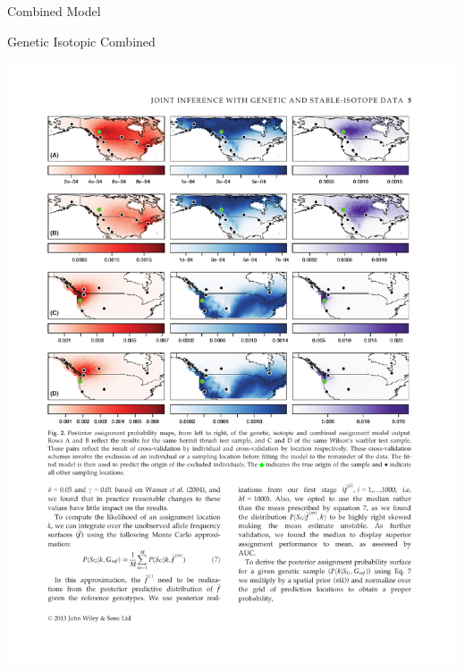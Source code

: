 \documentclass[11pt,ignorenonframetext,]{beamer}
\begin{document}
\begin{frame}{Combined Model}

\begin{center}
Genetic \qquad\qquad\qquad\quad
Isotopic \qquad\qquad\qquad\quad
Combined
\end{center}

\begin{center}
\includegraphics[width=\textwidth]{figs/hermit_maps.pdf}
\end{center}

\end{frame}
\end{document}
